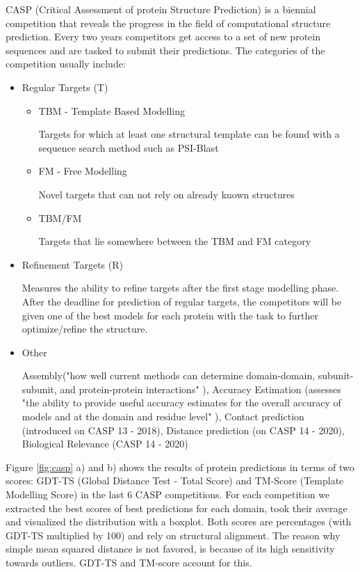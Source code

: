 CASP (Critical Assessment of protein Structure Prediction) is a biennial competition that reveals the progress in the field of computational structure prediction. Every two years competitors get access to a set of new protein sequences and are tasked to submit their predictions. The categories of the competition usually include:
\begin{itemize}
    \item Regular Targets (T)
    
    \begin{itemize}
        \item TBM - Template Based Modelling
        
        Targets for which at least one structural template can be found with a sequence search method such as PSI-Blast%
        \item FM - Free Modelling
        
        Novel targets that can not rely on already known structures
        \item TBM/FM
        
        Targets that lie somewhere between the TBM and FM category
    \end{itemize}
    
    \item Refinement Targets (R)
    
        Measures the ability to refine targets after the first stage modelling phase. After the deadline for prediction of regular targets, the competitors will be given one of the best models for each protein with the task to further optimize/refine the structure.
        
    \item Other
    
    Assembly("how well current methods can determine domain-domain, subunit-subunit, and protein-protein interactions" \cite{casp}), Accuracy Estimation (assesses "the ability to provide useful accuracy estimates for the overall accuracy of models and at the domain and residue level" \cite{casp}), Contact prediction (introduced on CASP 13 - 2018), Distance prediction (on CASP 14 - 2020), Biological Relevance (CASP 14 - 2020) \cite{casp, casp13}
\end{itemize}

Figure \ref{fig:casp} a) and b) shows the results of protein predictions in terms of two scores: GDT-TS (Global Distance Test - Total Score) and TM-Score (Template Modelling Score) in the last 6 CASP competitions. For each competition we extracted the best scores of best predictions for each domain, took their average and visualized the distribution with a boxplot.
Both scores are percentages (with GDT-TS multiplied by 100) and rely on structural alignment. The reason why simple mean squared distance is not favored, is because of its high sensitivity towards outliers. GDT-TS and TM-score account for this. 

